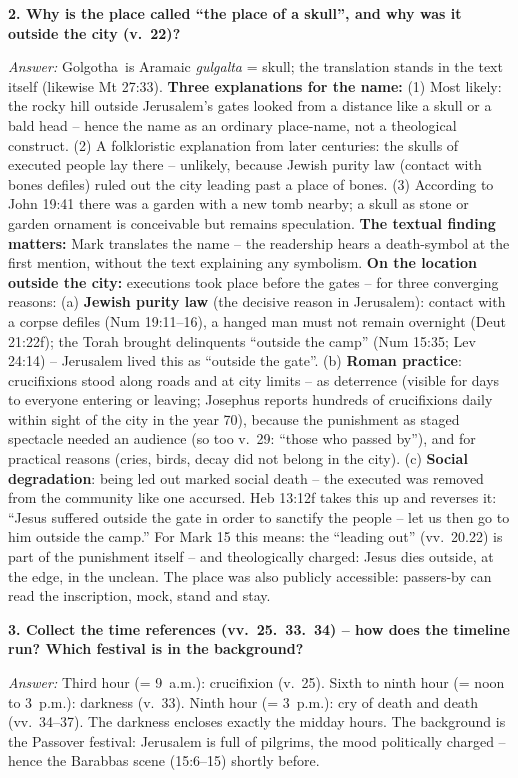 \documentclass[12pt,a4paper]{article}
\newcommand{\frage}[1]{\par\vspace{0.7em}\noindent\textbf{#1}\par}
\newcommand{\antwort}[1]{\par\noindent\textit{Answer:} #1\par}
\begin{document}
\frage{2. Why is the place called ``the place of a skull'', and why was it outside the city (v.~22)?}
\antwort{\glqq Golgotha\grqq\ is Aramaic \emph{gulgalta} = skull; the translation stands in the text itself (likewise Mt 27:33). \textbf{Three explanations for the name:} (1) Most likely: the rocky hill outside Jerusalem's gates looked from a distance like a skull or a bald head -- hence the name as an ordinary place-name, not a theological construct. (2) A folkloristic explanation from later centuries: the skulls of executed people lay there -- unlikely, because Jewish purity law (contact with bones defiles) ruled out the city leading past a place of bones. (3) According to John 19:41 there was a garden with a new tomb nearby; a skull as stone or garden ornament is conceivable but remains speculation. \textbf{The textual finding matters:} Mark translates the name -- the readership hears a death-symbol at the first mention, without the text explaining any symbolism. \textbf{On the location outside the city:} executions took place before the gates -- for three converging reasons: (a) \textbf{Jewish purity law} (the decisive reason in Jerusalem): contact with a corpse defiles (Num 19:11--16), a hanged man must not remain overnight (Deut 21:22f); the Torah brought delinquents ``outside the camp'' (Num 15:35; Lev 24:14) -- Jerusalem lived this as ``outside the gate''. (b) \textbf{Roman practice}: crucifixions stood along roads and at city limits -- as deterrence (visible for days to everyone entering or leaving; Josephus reports hundreds of crucifixions daily within sight of the city in the year 70), because the punishment as staged spectacle needed an audience (so too v.~29: ``those who passed by''), and for practical reasons (cries, birds, decay did not belong in the city). (c) \textbf{Social degradation}: being led out marked social death -- the executed was removed from the community like one accursed. Heb 13:12f takes this up and reverses it: ``Jesus suffered outside the gate in order to sanctify the people -- let us then go to him outside the camp.'' For Mark 15 this means: the ``leading out'' (vv.~20.22) is part of the punishment itself -- and theologically charged: Jesus dies outside, at the edge, in the unclean. The place was also publicly accessible: passers-by can read the inscription, mock, stand and stay.}

\frage{3. Collect the time references (vv.~25.~33.~34) -- how does the timeline run? Which festival is in the background?}
\antwort{Third hour (= 9~a.m.): crucifixion (v.~25). Sixth to ninth hour (= noon to 3~p.m.): darkness (v.~33). Ninth hour (= 3~p.m.): cry of death and death (vv.~34--37). The darkness encloses exactly the midday hours. The background is the Passover festival: Jerusalem is full of pilgrims, the mood politically charged -- hence the Barabbas scene (15:6--15) shortly before.}
\end{document}
